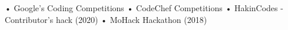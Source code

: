
\begin{cvparagraph}
• Google's Coding Competitions \newline
• CodeChef Competitions  \newline
• HakinCodes - Contributor's hack (2020) \newline
• MoHack Hackathon (2018) \newline

\end{cvparagraph}
